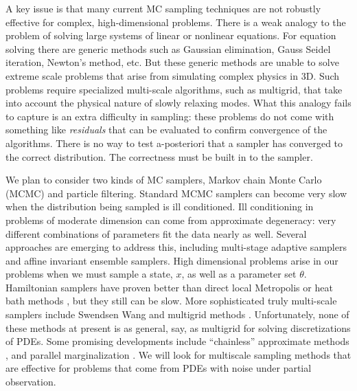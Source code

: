 \documentclass[11pt]{article}
\newcommand{\MarginPar}[1]{\marginpar{%
\vskip-\baselineskip %
\raggedright\tiny\sffamily
\hrule\smallskip{\color{red}#1}\par\smallskip\hrule}}
\begin{document}
A key issue is that many current MC sampling techniques are not robustly effective for complex, 
high-dimensional problems. 
There is a weak analogy to the problem of solving large systems of linear or nonlinear equations.
For equation solving there are generic methods such as Gaussian elimination, Gauss Seidel iteration,
Newton's method, etc.
But these generic methods are unable to solve extreme scale problems that arise from simulating
complex physics in 3D.
Such problems require specialized multi-scale algorithms, such as multigrid, that take into account the
physical nature of slowly relaxing modes.
What this analogy fails to capture is an extra difficulty in sampling: these problems do not come with 
something like {\em residuals} that can be evaluated to confirm convergence of the algorithms.
There is no way to test a-posteriori that a sampler has converged to the correct distribution.
The correctness must be built in to the sampler.

We plan to consider two kinds of MC samplers, Markov chain Monte Carlo (MCMC) and particle filtering.
Standard MCMC samplers can become very slow when the distribution being
sampled is ill conditioned.
Ill conditioning in problems of moderate dimension can come from approximate degeneracy: very
different combinations of parameters fit the data nearly as well.
Several approaches are emerging to address this, including multi-stage adaptive samplers and
affine invariant ensemble samplers.
High dimensional problems arise in our problems when we must sample a state, $x$, as well as a
parameter set $\theta$.
Hamiltonian samplers have proven better than direct local Metropolis or heat bath methods \cite{Hanson2001}, but
they still can be slow.
More sophisticated truly multi-scale samplers include Swendsen Wang \cite{SwendsonWang1987}
and multigrid methods \cite{Goodman1989}.
Unfortunately, none of these methods at present is as general, say, as multigrid for
solving discretizations of PDEs.
Some promising developments include ``chainless'' approximate methods \cite{Chorin:2008}, and
parallel marginalization \cite{Weare2007}. 
We will look for multiscale sampling methods that are effective for problems that come from PDEs
with noise under partial observation.
\end{document}
